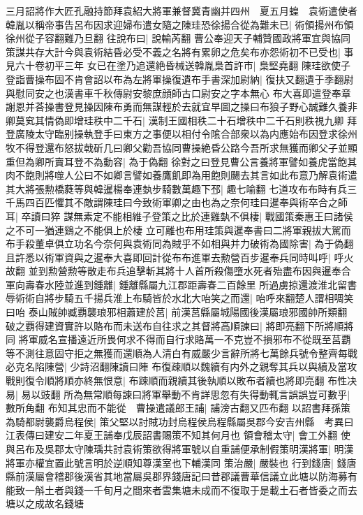 三月詔將作大匠孔融持節拜袁紹大將軍兼督冀青幽并四州　夏五月蝗　袁術遣使者韓胤以稱帝事告呂布因求迎婦布遣女隨之陳珪恐徐揚合從為難未已|{
	術領揚州布領徐州從子容翻難乃旦翻}
往說布曰|{
	說輸芮翻}
曹公奉迎天子輔贊國政將軍宜與協同策謀共存大計今與袁術結昏必受不義之名將有累卵之危矣布亦怨術初不已受也|{
	事見六十卷初平三年}
女已在塗乃追還絶昏械送韓胤梟首許市|{
	梟堅堯翻}
陳珪欲使子登詣曹操布固不肯會詔以布為左將軍操復遺布手書深加尉納|{
	復扶又翻遺于季翻尉與慰同安之也漢書車千秋傳尉安黎庶顔師古口尉安之字本無心}
布大喜即遣登奉章謝恩并荅操書登見操因陳布勇而無謀輕於去就宜早圖之操曰布狼子野心誠難久養非卿莫䆒其情偽即增珪秩中二千石|{
	漢制王國相秩二十石增秩中二千石則秩視九卿}
拜登廣陵太守臨别操執登手曰東方之事便以相付令隂合部衆以為内應始布因登求徐州牧不得登還布怒拔戟斫几曰卿父勸吾協同曹操絶昏公路今吾所求無獲而卿父子並顯重但為卿所賣耳登不為動容|{
	為于偽翻}
徐對之曰登見曹公言養將軍譬如養虎當飽其肉不飽則將噬人公曰不如卿言譬如養鷹飢即為用飽則颺去其言如此布意乃解袁術遣其大將張勲橋蕤等與韓暹楊奉連埶步騎數萬趣下邳|{
	趣七喻翻}
七道攻布布時有兵三千馬四百匹懼其不敵謂陳珪曰今致術軍卿之由也為之奈何珪曰暹奉與術卒合之師耳|{
	卒讀曰猝}
謀無素定不能相維子登策之比於連雞埶不俱棲|{
	戰國策秦惠王曰諸侯之不可一猶連鷄之不能俱上於棲}
立可離也布用珪策與暹奉書曰二將軍親拔大駕而布手殺董卓俱立功名今奈何與袁術同為賊乎不如相與并力破術為國除害|{
	為于偽翻}
且許悉以術軍資與之暹奉大喜即回計從布布進軍去勲營百步暹奉兵同時叫呼|{
	呼火故翻}
並到勲營勲等散走布兵追擊斬其將十人首所殺傷墮水死者殆盡布因與暹奉合軍向壽春水陸並進到鍾離|{
	鍾離縣屬九江郡距壽春二百餘里}
所過虜掠還渡淮北留書辱術術自將步騎五千揚兵淮上布騎皆於水北大咍笑之而還|{
	咍呼來翻楚人謂相啁笑曰咍}
泰山賊帥臧覇襲琅邪相蕭建於莒|{
	前漢莒縣屬城陽國後漢屬琅邪國帥所類翻}
破之覇得建資實許以賂布而未送布自往求之其督將高順諫曰|{
	將即亮翻下所將順將同}
將軍威名宣播遠近所畏何求不得而自行求賂萬一不克豈不損邪布不從既至莒覇等不測往意固守拒之無獲而還順為人清白有威嚴少言辭所將七萬餘兵號令整齊每戰必克名陷陳營|{
	少詩沼翻陳讀曰陣}
布復疎順以魏續有内外之親奪其兵以與續及當攻戰則復令順將順亦終無恨意|{
	布踈順而親續其後執順以敗布者續也將即亮翻}
布性决易|{
	易以豉翻}
所為無常順每諫曰將軍舉動不肯詳思忽有失得動輒言誤誤豈可數乎|{
	數所角翻}
布知其忠而不能從　曹操遣議郎王誧|{
	誧滂古翻又匹布翻}
以詔書拜孫策為騎都尉襲爵烏程侯|{
	策父堅以討賊功封烏程侯烏程縣屬吳郡今安吉州縣　考異曰江表傳曰建安二年夏王誧奉戊辰詔書賜策不知其何月也}
領會稽太守|{
	會工外翻}
使與呂布及吳郡太守陳瑀共討袁術策欲得將軍號以自重誧便承制假策明漢將軍|{
	明漢將軍亦權宜置此號言明於逆順知尊漢室也下輔漢同}
策治嚴|{
	嚴裝也}
行到錢唐|{
	錢唐縣前漢屬會稽郡後漢省其地當屬吳郡界錢唐記曰昔郡議曹華信議立此塘以防海募有能致一斛土者與錢一千旬月之間來者雲集塘未成而不復取于是載土石者皆委之而去塘以之成故名錢塘}
